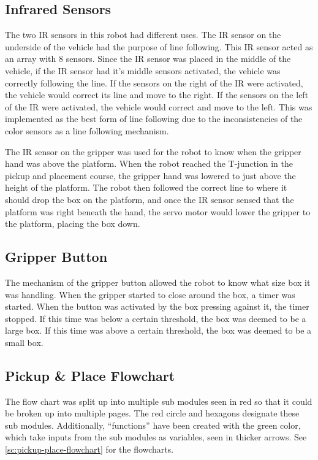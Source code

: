 \documentclass[11pt]{report}
\begin{document}
\subsection{Infrared Sensors}
The two \gls{IR} sensors in this robot had different uses. The \gls{IR} sensor on the underside of the vehicle had the purpose of line following. This \gls{IR} sensor acted as an array with 8 sensors. Since the \gls{IR} sensor was placed in the middle of the vehicle, if the \gls{IR} sensor had it's middle sensors activated, the vehicle was correctly following the line. If the sensors on the right of the \gls{IR} were activated, the vehicle would correct its line and move to the right. If the sensors on the left of the \gls{IR} were activated, the vehicle would correct and move to the left. This was implemented as the best form of line following due to the inconsistencies of the color sensors as a line following mechanism. 
\par The \gls{IR} sensor on the gripper was used for the robot to know when the gripper hand was above the platform. When the robot reached the T-junction in the pickup and placement course, the gripper hand was lowered to just above the height of the platform. The robot then followed the correct line to where it should drop the box on the platform, and once the \gls{IR} sensor sensed that the platform was right beneath the hand, the servo motor would lower the gripper to the platform, placing the box down.

\subsection{Gripper Button}
The mechanism of the gripper button allowed the robot to know what size box it was handling. When the gripper started to close around the box, a timer was started. When the button was activated by the box pressing against it, the timer stopped. If this time was below a certain threshold, the box was deemed to be a large box. If this time was above a certain threshold, the box was deemed to be a small box. 

\subsection{Pickup \& Place Flowchart}

The flow chart was split up into multiple sub modules seen in red so that it could be broken up into multiple pages. The red circle and hexagons designate these sub modules. Additionally, ``functions'' have been created with the green color, which take inputs from the sub modules as variables, seen in thicker arrows. See \cref{sc:pickup-place-flowchart} for the flowcharts.
\end{document}
